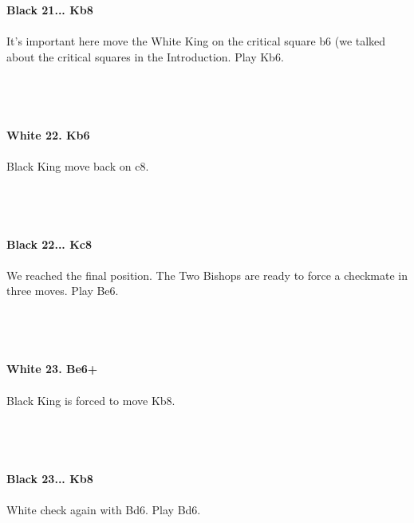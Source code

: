\documentclass{article}
\begin{document}
\\

\\
\\
\textbf{Black 21... Kb8}\\
\\
It's important here move the White King on the critical square b6 (we talked about the critical squares in the Introduction. Play Kb6.\\\\
\\

\\
\\
\textbf{White 22. Kb6}\\
\\
Black King move back on c8.\\\\
\\

\\
\\
\textbf{Black 22... Kc8}\\
\\
We reached the final position. The Two Bishops are ready to force a checkmate in three moves. Play Be6.\\\\
\\

\\
\\
\textbf{White 23. Be6+}\\
\\
Black King is forced to move Kb8.\\\\
\\

\\
\\
\textbf{Black 23... Kb8}\\
\\
White check again with Bd6. Play Bd6.\\\\
\\

\\
\\
\end{document}
